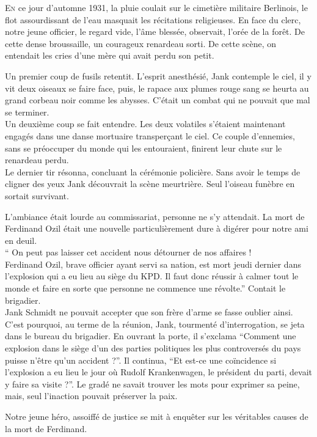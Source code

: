 \lettrine{E}{n} ce jour d'automne 1931, la pluie coulait sur le cimetière militaire Berlinois,
le flot assourdissant de l'eau masquait les récitations religieuses.
En face du clerc, notre jeune officier, le regard vide, l'âme blessée, observait, l'orée de la forêt. 
De cette dense broussaille, un courageux renardeau sorti.
De cette scène, on entendait les cries d'une mère qui avait perdu son petit.

Un premier coup de fusils retentit.
L'esprit anesthésié, Jank contemple le ciel, il y vit deux oiseaux se faire face, puis, le rapace aux plumes rouge sang se heurta au grand corbeau noir comme les abysses.
C'était un combat qui ne pouvait que mal se terminer.\\
Un deuxième coup se fait entendre.
Les deux volatiles s'étaient maintenant engagés dans une danse mortuaire transperçant le ciel.
Ce couple d'ennemies, sans se préoccuper du monde qui les entouraient, finirent leur chute sur le renardeau perdu.\\
Le dernier tir résonna, concluant la cérémonie policière.
Sans avoir le temps de cligner des yeux Jank découvrait la scène meurtrière.
Seul l'oiseau funèbre en sortait survivant.

L'ambiance était lourde au commissariat, personne ne s'y attendait.
La mort de Ferdinand Ozil était une nouvelle particulièrement dure à digérer pour notre ami en deuil.\\
\enquote{%
    On peut pas laisser cet accident nous détourner de nos affaires !\\
    Ferdinand Ozil, brave officier ayant servi sa nation, est mort jeudi dernier dans l'explosion qui a eu lieu au siège du KPD.
    Il faut donc réussir à calmer tout le monde et faire en sorte que personne ne commence une révolte.}
Contait le brigadier.\\
Jank Schmidt ne pouvait accepter que son frère d'arme se fasse oublier ainsi.
C'est pourquoi, au terme de la réunion, Jank, tourmenté d'interrogation, se jeta dans le bureau du brigadier.
En ouvrant la porte, il s'exclama
\enquote{Comment une explosion dans le siège d'un des parties politiques les plus controversés du pays puisse n'être qu'un accident ?}.
Il continua,
\enquote{Et est-ce une coïncidence si l'explosion a eu lieu le jour où Rudolf Krankenwagen, le président du parti, devait y faire sa visite ?}.
Le gradé ne savait trouver les mots pour exprimer sa peine, mais, seul l'inaction pouvait préserver la paix.

Notre jeune héro, assoiffé de justice se mit à enquêter sur les véritables causes de la mort de Ferdinand.

